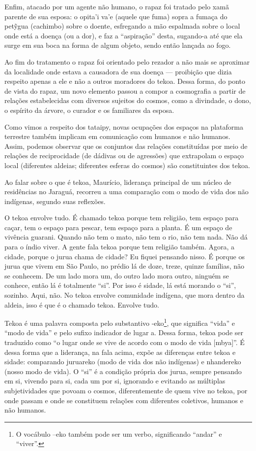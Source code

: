 Enfim, atacado por um agente não humano, o rapaz foi tratado pelo xamã
parente de sua esposa: o opita’i va’e (aquele que fuma) sopra a fumaça
do pet\~{y}gua (cachimbo) sobre o doente, esfregando a mão espalmada
sobre o local onde está a doença (ou a dor), e faz a ``aspiração'' desta,
sugando-a até que ela surge em sua boca na forma de algum objeto, sendo
então lançada ao fogo. 

Ao fim do tratamento o rapaz foi orientado pelo rezador a não mais se
aproximar da localidade onde estava a causadora de sua doença —
proibição que dizia respeito apenas a ele e não a outros moradores do
tekoa. Dessa forma, do ponto de vista do rapaz, um novo elemento passou
a compor a cosmografia a partir de relações estabelecidas com diversos
sujeitos do cosmos, como a divindade, o dono, o espírito da árvore, o
curador e os familiares da esposa.

Como vimos a respeito dos tataipy, novas ocupações dos espaços na
plataforma terrestre também implicam em comunicação com humanos e não
humanos. Assim, podemos observar que os conjuntos das relações
constituídas por meio de relações de reciprocidade (de dádivas ou de
agressões) que extrapolam o espaço local (diferentes aldeias;
diferentes esferas do cosmos) são constituintes dos tekoa.

Ao falar sobre o que é tekoa, Maurício, liderança principal de um núcleo
de residências no Jaraguá, recorreu a uma comparação com o modo de vida
dos não indígenas, segundo suas reflexões.

O tekoa envolve tudo. É chamado tekoa porque tem religião, tem espaço
para caçar, tem o espaço para pescar, tem espaço para a planta. É um
espaço de vivência guarani. Quando não tem o mato, não tem o rio, não
tem nada. Não dá para o índio viver. A gente fala tekoa porque tem
religião também. Agora, a cidade, porque o jurua chama de cidade? Eu
fiquei pensando nisso. É porque os jurua que vivem em São Paulo, no
prédio lá de doze, treze, quinze famílias, não se conhecem. De um lado
mora um, do outro lado mora outro, ninguém se conhece, então lá é
totalmente ``si''. Por isso é sidade, lá está morando o ``si'', sozinho.
Aqui, não. No tekoa envolve comunidade indígena, que mora dentro da
aldeia, isso é que é o chamado tekoa. Envolve tudo.

Tekoa é uma palavra composta pelo substantivo -eko\footnote{O vocábulo
–eko também pode ser um verbo, significando ``andar'' e ``viver''.}, que
significa ``vida'' e ``modo de vida'' e pelo sufixo indicador de lugar a.
Dessa forma, tekoa pode ser traduzido como ``o lugar onde se vive de
acordo com o modo de vida [mbya]''. É dessa forma que a liderança, na
fala acima, expõe as diferenças entre tekoa e sidade: comparando
juruareko (modo de vida dos não indígenas) e nhandereko (nosso modo de
vida). O ``si'' é a condição própria dos jurua, sempre pensando em si,
vivendo para si, cada um por si, ignorando e evitando as múltiplas
subjetividades que povoam o cosmos, diferentemente de quem vive no
tekoa, por onde passam e onde se constituem relações com diferentes
coletivos, humanos e não humanos.

